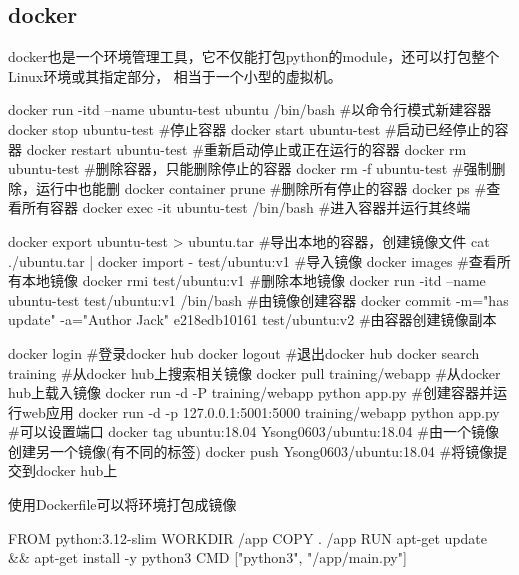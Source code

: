  \subsection{docker}
    docker也是一个环境管理工具，它不仅能打包python的module，还可以打包整个Linux环境或其指定部分，
    相当于一个小型的虚拟机。
    \begin{codeblock}[language=bash, caption={docker}]
      docker run -itd --name ubuntu-test ubuntu /bin/bash #以命令行模式新建容器
      docker stop ubuntu-test #停止容器
      docker start ubuntu-test #启动已经停止的容器
      docker restart ubuntu-test #重新启动停止或正在运行的容器
      docker rm ubuntu-test #删除容器，只能删除停止的容器
      docker rm -f ubuntu-test #强制删除，运行中也能删
      docker container prune #删除所有停止的容器
      docker ps #查看所有容器
      docker exec -it ubuntu-test /bin/bash #进入容器并运行其终端

      docker export ubuntu-test > ubuntu.tar #导出本地的容器，创建镜像文件
      cat ./ubuntu.tar | docker import - test/ubuntu:v1 #导入镜像
      docker images #查看所有本地镜像
      docker rmi test/ubuntu:v1 #删除本地镜像
      docker run -itd --name ubuntu-test test/ubuntu:v1 /bin/bash #由镜像创建容器
      docker commit -m="has update" -a="Author Jack" e218edb10161 test/ubuntu:v2
          #由容器创建镜像副本

      docker login #登录docker hub
      docker logout #退出docker hub
      docker search training #从docker hub上搜索相关镜像
      docker pull training/webapp #从docker hub上载入镜像
      docker run -d -P training/webapp python app.py #创建容器并运行web应用
      docker run -d -p 127.0.0.1:5001:5000 training/webapp python app.py #可以设置端口
      docker tag ubuntu:18.04 Ysong0603/ubuntu:18.04 #由一个镜像创建另一个镜像(有不同的标签)
      docker push Ysong0603/ubuntu:18.04 #将镜像提交到docker hub上
    \end{codeblock}

      使用Dockerfile可以将环境打包成镜像
      \begin{codeblock}[language=bash, caption={Dockerfile}]
        FROM python:3.12-slim
        WORKDIR /app
        COPY . /app
        RUN apt-get update && apt-get install -y python3
        CMD ["python3", "/app/main.py"]
      \end{codeblock}

